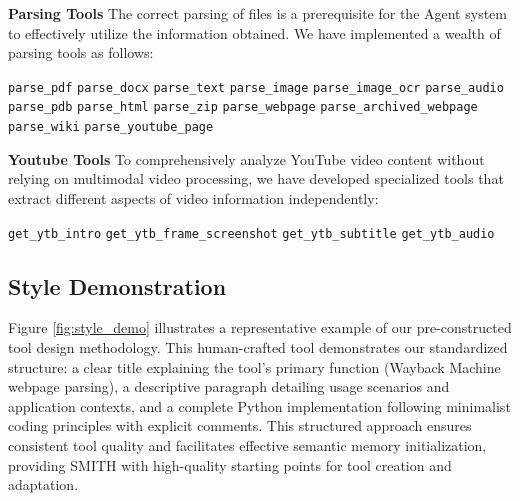 \documentclass{article} %
\begin{document}
\noindent \textbf{Parsing Tools}
The correct parsing of files is a prerequisite for the Agent system to effectively utilize the information obtained. We have implemented a wealth of parsing tools as follows:

\begin{center}
\begin{tcolorbox}[colback=white, colframe=black, arc=3mm, width=0.85\textwidth]
    \texttt{parse\_pdf} 
    \texttt{parse\_docx}
    \texttt{parse\_text}
    \texttt{parse\_image}
    \texttt{parse\_image\_ocr}
    \texttt{parse\_audio}
    \texttt{parse\_pdb}
    \texttt{parse\_html}
    \texttt{parse\_zip}
    \texttt{parse\_webpage}
    \texttt{parse\_archived\_webpage}
    \texttt{parse\_wiki}
    \texttt{parse\_youtube\_page}
   \end{tcolorbox}
\end{center}

\noindent \textbf{Youtube Tools}
To comprehensively analyze YouTube video content without relying on multimodal video processing, we have developed specialized tools that extract different aspects of video information independently:

\begin{center}
\begin{tcolorbox}[colback=white, colframe=black, arc=3mm, width=0.85\textwidth]
    \texttt{get\_ytb\_intro}
    \texttt{get\_ytb\_frame\_screenshot}
    \texttt{get\_ytb\_subtitle}
    \texttt{get\_ytb\_audio}
   \end{tcolorbox}
\end{center}

\subsection{Style Demonstration}
\label{tool_style}

Figure \ref{fig:style_demo} illustrates a representative example of our pre-constructed tool design methodology. This human-crafted tool demonstrates our standardized structure: a clear title explaining the tool's primary function (Wayback Machine webpage parsing), a descriptive paragraph detailing usage scenarios and application contexts, and a complete Python implementation following minimalist coding principles with explicit comments. This structured approach ensures consistent tool quality and facilitates effective semantic memory initialization, providing SMITH with high-quality starting points for tool creation and adaptation.
\end{document}
